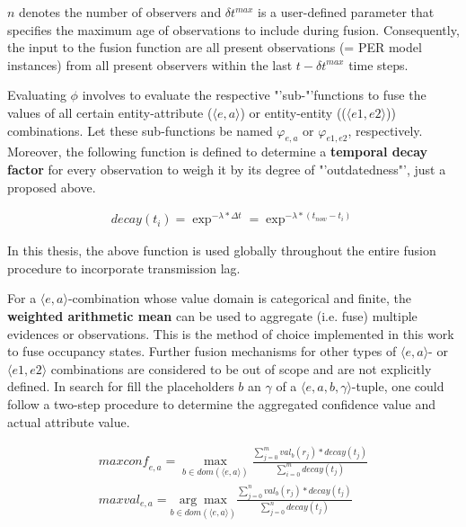 $n$ denotes the number of observers and $\delta t^{max}$ is a user-defined parameter that specifies the maximum age of observations to include during fusion. Consequently, the input to the fusion function are all present observations (= PER model instances) from all present observers within the last $t - \delta t^{max}$ time steps.

Evaluating $\phi$ involves to evaluate the respective "'sub-"'functions to fuse the values of all certain entity-attribute ($\langle e, a \rangle$) or entity-entity (($\langle e1, e2 \rangle$)) combinations. Let these sub-functions be named $\varphi_{e,a}$ or $\varphi_{e1,e2}$, respectively. Moreover, the following function is defined to determine a \textbf{temporal decay factor} for every observation to weigh it by its degree of "'outdatedness"', just a proposed above.

\begin{gather}
	\textit{decay}(t_i) = \exp^{-\lambda * \Delta t} = \exp^{-\lambda * (t_{now} - t_i)}
\end{gather}

In this thesis, the above function is used globally throughout the entire fusion procedure to incorporate transmission lag.
\par
\bigskip

For a $\langle e, a \rangle$-combination whose value domain is categorical and finite, the \textbf{weighted arithmetic mean} can be used to aggregate (i.e. fuse) multiple evidences or observations. This is the method of choice implemented in this work to fuse occupancy states. Further fusion mechanisms for other types of $\langle e, a \rangle$- or $\langle e1, e2 \rangle$ combinations are considered to be out of scope and are not explicitly defined. In search for fill the placeholders $b$ an $\gamma$ of a $\langle e, a, b, \gamma \rangle$-tuple, one could follow a two-step procedure to determine the aggregated confidence value and actual attribute value.

\begin{gather*}
	\textit{maxconf}_{e,a} = \underset{b \in \textit{dom}(\langle e, a \rangle)}{\max} \frac{\sum_{j = 0}^{m} \textit{val}_b(r_j) * \textit{decay}(t_j)}{\sum_{i = 0}^{m} \textit{decay}(t_j)} \\\textit{maxval}_{e,a} = \underset{b \in \textit{dom}(\langle e, a \rangle)}{\arg\max} \frac{\sum_{j = 0}^{n} \textit{val}_b(r_j) * \textit{decay}(t_j)}{\sum_{j = 0}^{n} \textit{decay}(t_j)} \\
\end{gather*}

